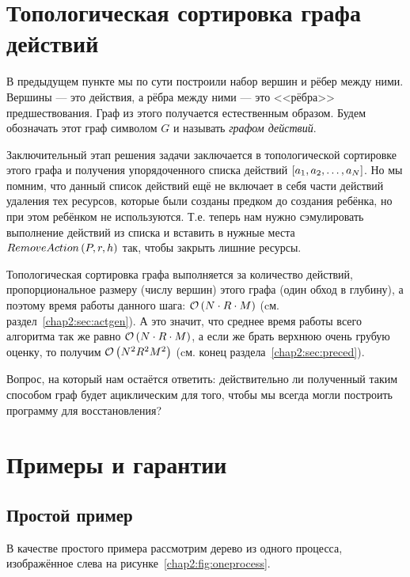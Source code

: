 \section{Топологическая сортировка графа действий}
\label{chap2:sec:topsort}

В предыдущем пункте мы по сути построили набор вершин и рёбер между ними. Вершины --- это действия, а рёбра между ними --- это <<рёбра>> предшествования. Граф из этого получается естественным образом. Будем обозначать этот граф символом $G$ и называть \emph{графом действий}.

Заключительный этап решения задачи заключается в топологической сортировке этого графа и получения упорядоченного списка действий $\left[ a_1, a_2, \ldots, a_{N} \right]$. Но мы помним, что данный список действий ещё не включает в себя части действий удаления тех ресурсов, которые были созданы предком до создания ребёнка, но при этом ребёнком не используются. Т.е. теперь нам нужно сэмулировать выполнение действий из списка и вставить в нужные места $RemoveAction\left( P, r, h \right)$ так, чтобы закрыть лишние ресурсы.

Топологическая сортировка графа выполняется за количество действий, пропорциональное размеру (числу вершин) этого графа (один обход в глубину), а поэтому время работы данного шага: $\mathcal{O}\left(N \cdot R \cdot M\right)$ (cм. раздел~\ref{chap2:sec:actgen}). А это значит, что среднее время работы всего алгоритма так же равно $\mathcal{O}\left(N \cdot R \cdot M\right)$, а если же брать верхнюю очень грубую оценку, то получим $\mathcal{O}\left(N^2R^2M^2\right)$ (cм. конец раздела~\ref{chap2:sec:preced}).

Вопрос, на который нам остаётся ответить: действительно ли полученный таким способом граф будет ациклическим для того, 
чтобы мы всегда могли построить программу для восстановления?

\section{Примеры и гарантии}
\label{chap2:seq:guarantees}

\subsection{Простой пример}

В качестве простого примера рассмотрим дерево из одного процесса, изображённое слева на рисунке~\ref{chap2:fig:oneprocess}.

